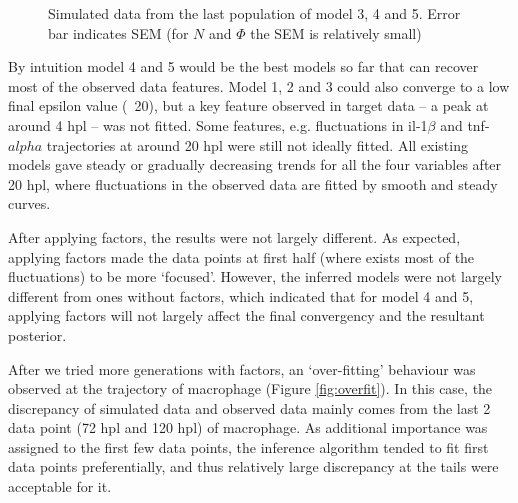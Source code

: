 \begin{figure}
    \begin{center}
    \end{center}

    \caption[Simulated data from the last population of model 3, 4 and 5]{Simulated data from the last population of model 3, 4 and 5. Error bar indicates SEM (for $N$ and $\Phi$ the SEM is relatively small)}
    \label{fig:resultCurve345}

\end{figure}

By intuition model 4 and 5 would be the best models so far that can recover most of the observed data features. Model 1, 2 and 3 could also converge to a low final epsilon value (~20), but a key feature observed in target data -- a peak at around 4 hpl -- was not fitted. Some features, e.g. fluctuations in il-1$\beta$ and tnf-$alpha$ trajectories at around 20 hpl were still not ideally fitted. All existing models gave steady or gradually decreasing trends for all the four variables after 20 hpl, where fluctuations in the observed data are fitted by smooth and steady curves.

After applying factors, the results were not largely different. As expected, applying factors made the data points at first half (where exists most of the fluctuations) to be more `focused'. However, the inferred models were not largely different from ones without factors, which indicated that for model 4 and 5, applying factors will not largely affect the final convergency and the resultant posterior.

After we tried more generations with factors, an `over-fitting' behaviour was observed at the trajectory of macrophage (Figure \ref{fig:overfit}). In this case, the discrepancy of simulated data and observed data mainly comes from the last 2 data point (72 hpl and 120 hpl) of macrophage. As additional importance was assigned to the first few data points, the inference algorithm tended to fit first data points preferentially, and thus relatively large discrepancy at the tails were acceptable for it.


